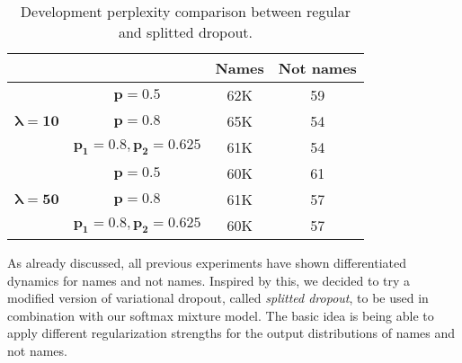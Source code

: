 \begin{table}[H]
	\centering
	\begin{tabular}{cc|c|c|}
		\cline{3-4}
		&                                                                                                               & \textbf{Names} & \textbf{Not names} \\ \hline
		\multicolumn{1}{|c|}{\multirow{3}{*}{$\boldsymbol{\lambda}\mathbf{=10}$}} & $\mathbf{p=0.5}$                                                                                              & 62K            & 59                 \\ \cline{2-4} 
		\multicolumn{1}{|c|}{}                                                    & $\mathbf{p=0.8}$                                                                                              & 65K            & 54                 \\ \cline{2-4} 
		\multicolumn{1}{|c|}{}                                                    & 
		$\mathbf{p_1}=0.8,\mathbf{p_2}=0.625$   & 61K            & 54                 \\ \hline
		\multicolumn{1}{|c|}{\multirow{3}{*}{$\boldsymbol{\lambda}\mathbf{=50}$}} & $\mathbf{p=0.5}$                                                                                              & 60K            & 61                 \\ \cline{2-4} 
		\multicolumn{1}{|c|}{}                                                    & $\mathbf{p=0.8}$                                                                                              & 61K            & 57                 \\ \cline{2-4} 
		\multicolumn{1}{|c|}{}                                                    & 
		$\mathbf{p_1}=0.8,\mathbf{p_2}=0.625$ & 60K            & 57                 \\ \hline
	\end{tabular}
	\caption{Development perplexity comparison between regular and splitted dropout.}
	\label{splittedDropPerplexities}
\end{table}

As already discussed, all previous experiments have shown differentiated dynamics for names and not names. Inspired by this, we decided to try a modified version of variational dropout, called \textit{splitted dropout}, to be used in combination with our softmax mixture model. The basic idea is being able to apply different regularization strengths for the output distributions of names and not names. 

